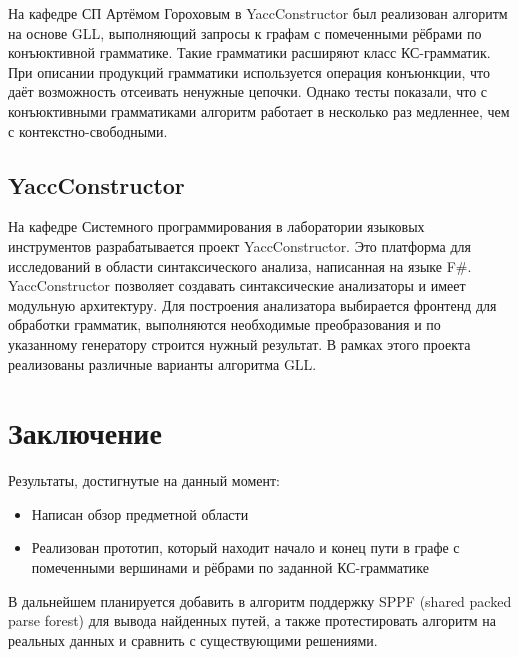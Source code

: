 \documentclass[14pt]{matmex-diploma}
\begin{document}
    На кафедре СП Артёмом Гороховым в YaccConstructor был реализован алгоритм \cite{conjCF} на основе GLL, выполняющий запросы к графам с помеченными рёбрами по конъюктивной грамматике. Такие грамматики расширяют класс КС-грамматик. При описании продукций грамматики используется операция конъюнкции, что даёт возможность отсеивать ненужные цепочки. Однако тесты показали, что с конъюктивными грамматиками алгоритм работает в несколько раз медленнее, чем с контекстно-свободными.
    \subsection{YaccConstructor}
    На кафедре Системного программирования в лаборатории языковых инструментов разрабатывается проект YaccConstructor. Это платформа для исследований в области синтаксического анализа, написанная на языке F\#. YaccConstructor позволяет создавать синтаксические анализаторы и имеет модульную архитектуру. Для построения анализатора  выбирается фронтенд для обработки грамматик, выполняются необходимые преобразования и по указанному генератору строится нужный результат. В рамках этого проекта реализованы различные варианты алгоритма GLL.

\section{Заключение}
Результаты, достигнутые на данный момент:
\begin{itemize}
    \item Написан обзор предметной области
    \item Реализован прототип, который находит начало и конец пути в графе с помеченными вершинами и рёбрами по заданной КС-грамматике
\end{itemize}
В дальнейшем планируется добавить в алгоритм поддержку SPPF (shared packed parse forest) \cite{SPPF} для вывода найденных путей, а также  протестировать алгоритм на реальных данных и сравнить с существующими решениями.
\setmonofont[Mapping=tex-text]{CMU Typewriter Text}


\end{document}
